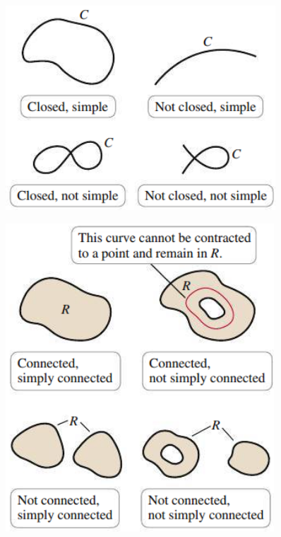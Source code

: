 \documentclass[mathNotesPreamble]{subfiles}
\begin{document}
  \noindent
  \begin{minipage}{0.5\linewidth}
    \begin{center}
      \includegraphics[width=0.9\linewidth]{images/briggs_17_03/fig17_28}
    \end{center}
  \end{minipage}%
  \begin{minipage}{0.5\linewidth}
    \begin{center}
      \includegraphics[width=0.8\linewidth]{images/briggs_17_03/fig17_29}
    \end{center}
  \end{minipage}%
\end{document}
